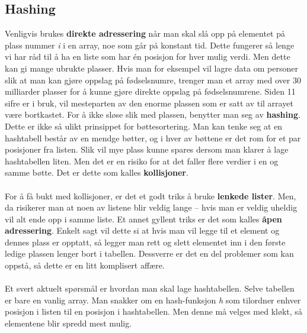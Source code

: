 \subsection{Hashing}
Venligvis brukes \textbf{direkte adressering} når man skal slå opp på elementet på plass nummer \textit{i} i en array, noe som går på konstant tid. Dette fungerer så lenge vi har råd til å ha en liste som har én posisjon for hver mulig verdi. Men dette kan gi mange ubrukte plasser. Hvis man for eksempel vil lagre data om personer slik at man kan gjøre oppslag på fødselsnumre, trenger man et array med over 30 milliarder plasser for å kunne gjøre direkte oppslag på fødselsnumrene. Siden 11 sifre er i bruk, vil mesteparten av den enorme plassen som er satt av til arrayet være bortkastet. For å ikke sløse slik med plassen, benytter man seg av \textbf{hashing}. Dette er ikke så ulikt prinsippet for bøttesortering. Man kan tenke seg at en hashtabell består av en mendge bøtter, og i hver av bøttene er det rom for et par posisjoner fra listen. Slik vil mye plass kunne spares dersom man klarer å lage hashtabellen liten. Men det er en risiko for at det faller flere verdier i en og samme bøtte. Det er dette som kalles \textbf{kollisjoner}.
\\\\
For å få bukt med kollisjoner, er det et godt triks å bruke \textbf{lenkede lister}. Men, da risikerer man at noen av listene blir veldig lange – hvis man er veldig uheldig vil alt ende opp i samme liste. Et annet gyllent triks er det som kalles \textbf{åpen adressering}. Enkelt sagt vil dette si at hvis man vil legge til et element og dennes plass er opptatt, så legger man rett og slett elementet inn i den første ledige plassen lenger bort i tabellen. Dessverre er det en del problemer som kan oppstå, så dette er en litt komplisert affære.
\\\\
Et svert aktuelt spørsmål er hvordan man skal lage hashtabellen. Selve tabellen er bare en vanlig array. Man snakker om en hash-funksjon \textit{h} som tilordner enhver posisjon i listen til en posisjon i hashtabellen. Men denne må velges med kløkt, så elementene blir spredd mest mulig.

